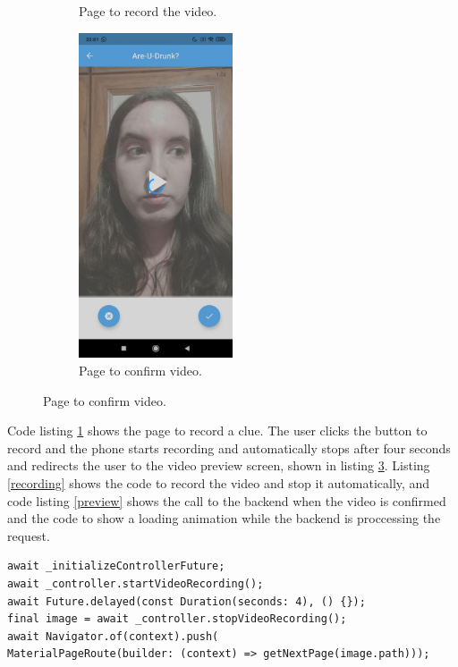 \begin{figure}[H]
\begin{subfigure}{0.33\textwidth}
      \caption{Page to record the video.}
      \label{recordvideo}
  \end{subfigure}
  \begin{subfigure}{0.33\textwidth}
      \centering
      \includegraphics[width=0.5\textwidth]{./img/videopreview.jpg}
      \caption{Page to confirm video.}
      \label{videopreview}
  \end{subfigure}
\end{figure}

Code listing \ref{recordvideo} shows the page to record a clue. The user clicks the button to record and the phone starts recording and automatically stops after four seconds and redirects the user to the video preview screen, shown in listing \ref{videopreview}. Listing \ref{recording} shows the code to record the video and stop it automatically, and code listing \ref{preview} shows the call to the backend when the video is confirmed and the code to show a loading animation while the backend is proccessing the request.

\begin{lstlisting}[language=flutter, basicstyle=\small, label={recording}, caption={Code to record video automatically}, captionpos=b]
await _initializeControllerFuture;
await _controller.startVideoRecording();
await Future.delayed(const Duration(seconds: 4), () {});
final image = await _controller.stopVideoRecording();
await Navigator.of(context).push(
MaterialPageRoute(builder: (context) => getNextPage(image.path)));
\end{lstlisting}

